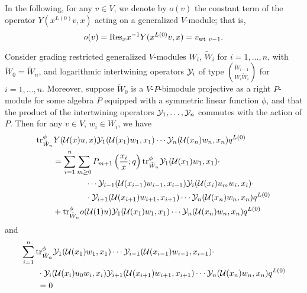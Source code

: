 \documentclass[12pt]{article}
\begin{document}
In the following, for any $v\in V$, we denote by $o(v)$ the constant term of
the operator $Y(x^{L(0)}v, x)$ acting on a generalized $V$-module; that is,
$$
  o(v) = \mbox{\rm Res}_x x^{-1}Y(x^{L(0)}v,x) = v_{\mbox{\rm {\scriptsize wt}}\  v - 1}.
$$

\begin{lemma}
  Consider grading restricted generalized $V$-modules $W_i$, $\tilde W_i$
  for $i=1,\ldots,n$, with $\tilde W_0 = \tilde W_n$, and logarithmic intertwining
  operators $\mathcal{Y}_i$ of type $\binom{\tilde W_{i-1}}{W_i \tilde W_i}$ for
  $i=1,\ldots,n$. Moreover, suppose $\tilde W_0$ is a $V$-$P$-bimodule
  projective as a right $P$-module for some algebra
  $P$ equipped with a symmetric linear function $\phi$, and that the product
  of the intertwining operators $\mathcal{Y}_1,\ldots, \mathcal{Y}_n$ commutes with the action
  of $P$.
  Then for any $v\in V$, $w_i\in W_i$, we have
  \begin{align}\label{identity1}
    &\mbox{\rm tr}^\phi_{\tilde W_n} Y(\mathcal{U}(x)u,x)\mathcal{Y}_1(\mathcal{U}(x_1)w_1,x_1)\cdots
    \mathcal{Y}_n(\mathcal{U}(x_n)w_n,x_n)q^{L(0)}\nonumber \\
    &\qquad = \sum_{i=1}^n\sum_{m\geq 0} P_{m+1}\left(\frac{x_i}{x}; q\right)
    \mbox{\rm tr}^\phi_{\tilde W_n} \mathcal{Y}_1(\mathcal{U}(x_1)w_1,x_1)\cdot\nonumber \\
    &\qquad\qquad\qquad\cdots \mathcal{Y}_{i-1}(\mathcal{U}(x_{i-1})w_{i-1},x_{i-1})
      \mathcal{Y}_i(\mathcal{U}(x_i)u_m w_i,x_i)\cdot\nonumber \\
    &\qquad\qquad\qquad\cdot \mathcal{Y}_{i+1}(\mathcal{U}(x_{i+1})w_{i+1},x_{i+1})\cdots
      \mathcal{Y}_{n}(\mathcal{U}(x_{n})w_{n},x_{n})q^{L(0)}\nonumber \\
    &\qquad + \mbox{\rm tr}^\phi_{\tilde W_n} o(\mathcal{U}(1)u)\mathcal{Y}_{1}(\mathcal{U}(x_{1})w_{1},x_{1})\cdots \mathcal{Y}_{n}(\mathcal{U}(x_{n})w_{n},x_{n}) q^{L(0)}
  \end{align}
  and
  \begin{align}\label{identity2}
    &\sum_{i=1}^n \mbox{\rm tr}^\phi_{\tilde W_n} \mathcal{Y}_{1}(\mathcal{U}(x_{1})w_{1},x_{1})\cdots
      \mathcal{Y}_{i-1}(\mathcal{U}(x_{i-1})w_{i-1},x_{i-1})\cdot\nonumber \\
      &\qquad\cdot \mathcal{Y}_i(\mathcal{U}(x_i)u_0w_i,x_i)
      \mathcal{Y}_{i+1}(\mathcal{U}(x_{i+1})w_{i+1},x_{i+1}) \cdots\mathcal{Y}_{n}(\mathcal{U}(x_{n})w_{n},x_{n}) q^{L(0)}\nonumber \\
      &\qquad = 0
    \end{align}
\end{lemma}
\end{document}
